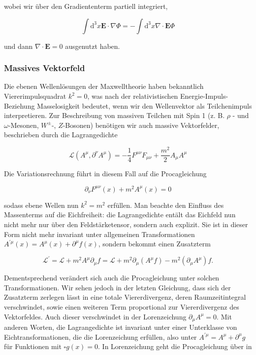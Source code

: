 \documentclass[10pt, letterpaper]{article}
\begin{document}
wobei wir über den Gradiententerm partiell integriert,

$$
\int \mathrm{d}^{3} x \mathbf{E} \cdot \nabla \Phi=-\int \mathrm{d}^{3} x \nabla \cdot \mathbf{E} \Phi
$$

und dann $\nabla \cdot \mathbf{E}=0$ ausgenutzt haben.

\subsubsection*{Massives Vektorfeld}
Die ebenen Wellenlösungen der Maxwelltheorie haben bekanntlich Viererimpulsquadrat $k^{2}=0$, was nach der relativistischen Energie-Impuls-Beziehung Masselosigkeit bedeutet, wenn wir den Wellenvektor als Teilchenimpuls interpretieren. Zur Beschreibung von massiven Teilchen mit Spin 1 (z. B. $\rho$ - und $\omega$-Mesonen, $W^{ \pm}$-, $Z$-Bosonen) benötigen wir auch massive Vektorfelder, beschrieben durch die Lagrangedichte

$$
\mathscr{L}\left(A^{\mu}, \partial^{\nu} A^{\mu}\right)=-\frac{1}{4} F^{\mu \nu} F_{\mu \nu}+\frac{m^{2}}{2} A_{\mu} A^{\mu}
$$

Die Variationsrechnung führt in diesem Fall auf die Procagleichung

$$
\partial_{\nu} F^{\mu \nu}(x)+m^{2} A^{\mu}(x)=0
$$

sodass ebene Wellen nun $k^{2}=m^{2}$ erfüllen. Man beachte den Einfluss des Massenterms auf die Eichfreiheit: die Lagrangedichte entält das Eichfeld nun nicht mehr nur über den Feldstärketensor, sondern auch explizit. Sie ist in dieser Form nicht mehr invariant unter allgemeinen Transformationen $A^{\prime \mu}(x)=A^{\mu}(x)+\partial^{\mu} f(x)$, sondern bekommt einen Zusatzterm

$$
\mathscr{L}^{\prime}=\mathscr{L}+m^{2} A^{\mu} \partial_{\mu} f=\mathscr{L}+m^{2} \partial_{\mu}\left(A^{\mu} f\right)-m^{2}\left(\partial_{\mu} A^{\mu}\right) f .
$$

Dementsprechend verändert sich auch die Procagleichung unter solchen Transformationen. Wir sehen jedoch in der letzten Gleichung, dass sich der Zusatzterm zerlegen lässt in eine totale Viererdivergenz, deren Raumzeitintegral verschwindet, sowie einen weiteren Term proportional zur Viererdivergenz des Vektorfeldes. Auch dieser verschwindet in der Lorenzeichung $\partial_{\mu} A^{\mu}=0$. Mit anderen Worten, die Lagrangedichte ist invariant unter einer Unterklasse von Eichtransformationen, die die Lorenzeichung erfüllen, also unter $A^{\prime \mu}=A^{\mu}+\partial^{\mu} g$ für Funktionen mit $\square g(x)=0$. In Lorenzeichung geht die Procagleichung über in
\end{document}
